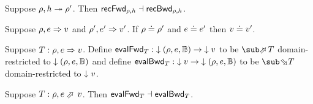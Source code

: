 \begin{theorem}
\label{thm:core-language:closeDefs:gc}
   Suppose $\rho, h \mathrel{\twoheadrightarrow} \rho'$.  Then $\mathsf{recFwd}_{\rho,h} \dashv \mathsf{recBwd}_{\rho,h}$.
\end{theorem}

\begin{lemma}
   Suppose $\rho, e \mathrel{\Rightarrow} v$ and $\rho', e' \mathrel{\Rightarrow} v'$. If $\rho \doteq \rho'$ and $e \doteq e'$ then $v \doteq v'$.
\end{lemma}

\begin{definition}
   Suppose $T: \rho, e \mathrel{\Rightarrow} v$. Define $\mathsf{evalFwd}_{T}: {\downarrow{(\rho, e, \mathbb{B})}} \to {\downarrow{v}}$ to be $\evalFwdR{T}$ domain-restricted to ${\downarrow{(\rho, e, \mathbb{B})}}$ and define $\mathsf{evalBwd}_{T}: {\downarrow{v}} \to {\downarrow{(\rho, e, \mathbb{B})}}$ to be $\evalBwdR{T}$ domain-restricted to ${\downarrow{v}}$.
\end{definition}

\begin{theorem}
\label{thm:core-language:eval:gc}
   Suppose $T: \rho, e \evalFwdS v$.  Then $\mathsf{evalFwd}_{T} \dashv \mathsf{evalBwd}_{T}$.
\end{theorem}
